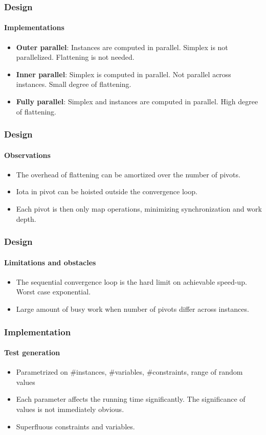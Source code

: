 \documentclass{beamer}
\begin{document}
\begin{frame}
\frametitle{Design}
\framesubtitle{Implementations}
\begin{itemize}
	\item \textbf{Outer parallel}: Instances are computed in parallel. Simplex is not parallelized. Flattening is not needed.
	
	\item \textbf{Inner parallel}: Simplex is computed in parallel. Not parallel across instances. Small degree of flattening.
	
	\item \textbf{Fully parallel}: Simplex and instances are computed in parallel. High degree of flattening.
\end{itemize}
\end{frame}

\begin{frame}
\frametitle{Design}
\framesubtitle{Observations}
\begin{itemize}
	\item The overhead of flattening can be amortized over the number of pivots.
	
	\item Iota in pivot can be hoisted outside the convergence loop.
	
	\item Each pivot is then only map operations, minimizing synchronization and work depth.
\end{itemize}
\end{frame}

\begin{frame}
\frametitle{Design}
\framesubtitle{Limitations and obstacles}
\begin{itemize}
	\item The sequential convergence loop is the hard limit on achievable speed-up. Worst case exponential. 
	
	\item Large amount of busy work when number of pivots differ across instances.
\end{itemize}
\end{frame}


\begin{frame}
	\frametitle{Implementation}
	\framesubtitle{Test generation}
	\begin{itemize}
		\item Parametrized on \#instances, \#variables, \#constraints, range of random values
		
		\item Each parameter affects the running time significantly. The significance of values is not immediately obvious.
		
		\item Superfluous constraints and variables.
	\end{itemize}
\end{frame}
\end{document}
